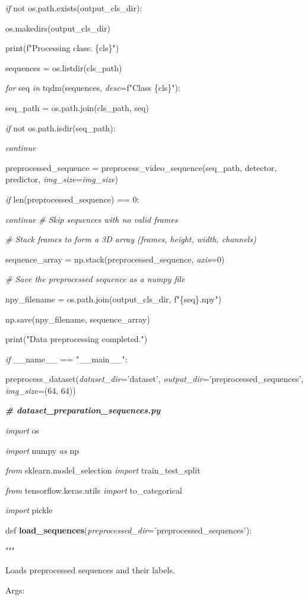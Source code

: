 \documentclass[
]{article}
\begin{document}
\emph{if} not os.path.exists(output\_cls\_dir):

os.makedirs(output\_cls\_dir)

print(f"Processing class: \{cls\}")

sequences = os.listdir(cls\_path)

\emph{for} seq \emph{in} tqdm(sequences, \emph{desc}=f"Class \{cls\}"):

seq\_path = os.path.join(cls\_path, seq)

\emph{if} not os.path.isdir(seq\_path):

\emph{continue}

preprocessed\_sequence = preprocess\_video\_sequence(seq\_path, detector, predictor, \emph{img\_size}=\emph{img\_size})

\emph{if} len(preprocessed\_sequence) == 0:

\emph{continue} \emph{\# Skip sequences with no valid frames}

\emph{\# Stack frames to form a 3D array (frames, height, width, channels)}

sequence\_array = np.stack(preprocessed\_sequence, \emph{axis}=0)

\emph{\# Save the preprocessed sequence as a numpy file}

npy\_filename = os.path.join(output\_cls\_dir, f"\{seq\}.npy")

np.save(npy\_filename, sequence\_array)

print("Data preprocessing completed.")

\emph{if} \_\_name\_\_ == "\_\_main\_\_":

preprocess\_dataset(\emph{dataset\_dir}='dataset', \emph{output\_dir}='preprocessed\_sequences', \emph{img\_size}=(64, 64))

\emph{\textbf{\# dataset\_preparation\_sequences.py}}

\emph{import} os

\emph{import} numpy \emph{as} np

\emph{from} sklearn.model\_selection \emph{import} train\_test\_split

\emph{from} tensorflow.keras.utils \emph{import} to\_categorical

\emph{import} pickle

def \textbf{load\_sequences}(\emph{preprocessed\_dir}='preprocessed\_sequences'):

"""

Loads preprocessed sequences and their labels.

Args:
\end{document}
